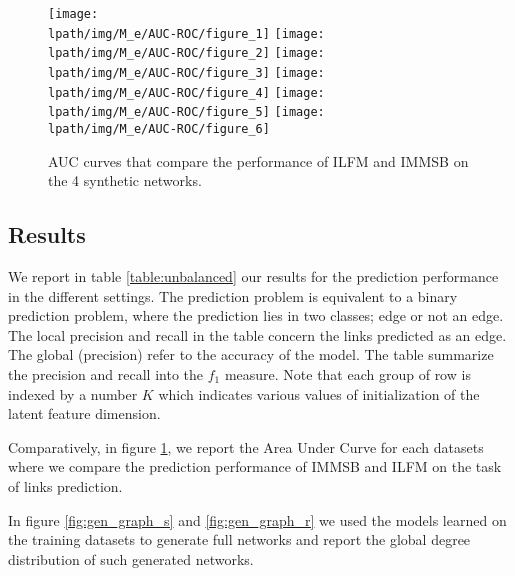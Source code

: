 \begin{figure}[h]
	\centering
	
	\texttt{[image: \\lpath/img/M\_e/AUC-ROC/figure\_1]}
	\endminipage
	\texttt{[image: \\lpath/img/M\_e/AUC-ROC/figure\_2]}
	\endminipage
	\vspace{-0.4cm}
	\texttt{[image: \\lpath/img/M\_e/AUC-ROC/figure\_3]}
	\endminipage
	\texttt{[image: \\lpath/img/M\_e/AUC-ROC/figure\_4]}
	\endminipage
		\vspace{-0.4cm}
	\texttt{[image: \\lpath/img/M\_e/AUC-ROC/figure\_5]}
	\endminipage
	\texttt{[image: \\lpath/img/M\_e/AUC-ROC/figure\_6]}
	\endminipage
	
	\caption{AUC curves that compare the performance of ILFM and IMMSB on the 4 synthetic networks.}
	\label{fig:auc}
\end{figure}



\subsection{Results}

We report in table \ref{table:unbalanced} our results for the prediction performance in the different settings. The prediction problem is equivalent to a binary prediction problem, where the prediction lies in two classes; edge or not an edge. The local precision and recall in the table concern the links predicted as an edge. The global (precision) refer to the accuracy of the model. The table summarize the precision and recall into the $f_1$ measure. Note that each group of row is indexed by  a number $K$ which indicates various values of initialization of the latent feature dimension.

Comparatively, in figure \ref{fig:auc}, we report the Area Under Curve for each datasets where we compare the prediction performance of IMMSB and ILFM on the task of links prediction.

In figure \ref{fig:gen_graph_s} and \ref{fig:gen_graph_r} we used the models learned on the training datasets to generate full networks and report the global degree distribution of such generated networks. 


